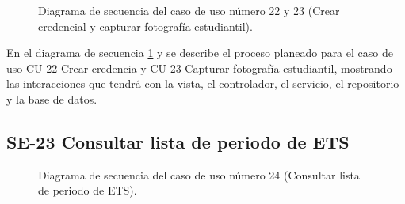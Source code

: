 \begin{figure}[htbp!]
	\begin{center}
		\caption{Diagrama de secuencia del caso de uso número 22 y 23 (Crear credencial y capturar fotografía estudiantil).}
		\label{fig:Diagrama de secuencia CU-22 y CU23}
	\end{center}
\end{figure}

En el diagrama de secuencia \ref{fig:Diagrama de secuencia CU-22 y CU23} y se describe el proceso planeado para el caso de uso \hyperlink{CU-22}{CU-22 Crear credencia} y \hyperlink{CU-23}{CU-23 Capturar fotografía estudiantil}, mostrando las interacciones que tendrá con la vista, el controlador, el servicio, el repositorio y la base de datos.

\newpage

\subsection{SE-23 Consultar lista de periodo de ETS}

\begin{figure}[htbp!]
	\begin{center}
		\caption{Diagrama de secuencia del caso de uso número 24 (Consultar lista de periodo de ETS).}
		\label{fig:Diagrama de secuencia CU-24}
	\end{center}
\end{figure}

